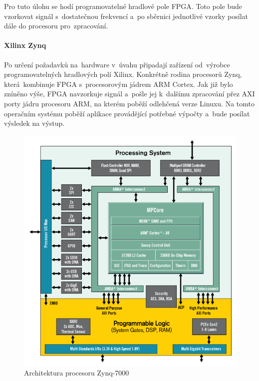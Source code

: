 			Pro tuto úlohu se hodí programovatelné hradlové pole FPGA. Toto pole bude vzorkovat signál s~dostatečnou frekvencí a~po sběrnici jednotlivé vzorky posílat dále do procesoru pro~zpracování.\par
			
			\paragraph{Xilinx Zynq}
				Po určení požadavků na~hardware v~úvahu připadají zařízení od~výrobce programovatelných hradlových polí Xilinx. Konkrétně rodina procesorů Zynq, která~kombinuje FPGA s~procesorovým jádrem ARM Cortex.
				Jak již bylo zníněno výše, FPGA navzorkuje signál a~pošle jej k~dalšímu zpracování přez AXI porty jádru procesoru ARM, na kterém poběží odlehčená verze Linuxu. Na tomto operačním systému poběží aplikace provádějící potřebné výpočty a~bude posílat výsledek na výstup.
				
				\begin{figure}[h]
					\begin{center}
						\includegraphics[scale=0.6]{obrazky-figures/zynq-mp-core-single.png}
						\caption{Architektura procesoru Zynq-7000\protect\footnotemark}
						\label{teorie::embedded::zynq}
					\end{center}
				\end{figure}
			
